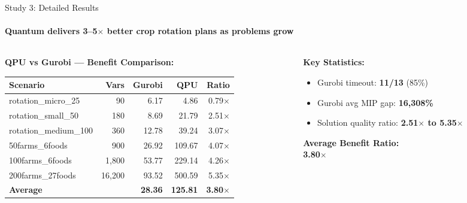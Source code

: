 \documentclass[aspectratio=169,10pt]{beamer}
\begin{document}
\begin{frame}{Study 3: Detailed Results}
\framesubtitle{Quantum delivers 3--5$\times$ better crop rotation plans as problems grow}
\small
\begin{columns}[T]
\begin{column}{0.55\textwidth}
\textbf{QPU vs Gurobi --- Benefit Comparison:}
\begin{table}[h]\scriptsize
\centering
\begin{tabular}{lrrrr}
\toprule
\textbf{Scenario} & \textbf{Vars} & \textbf{Gurobi} & \textbf{QPU} & \textbf{Ratio} \\
\midrule
rotation\_micro\_25 & 90 & 6.17 & 4.86 & 0.79$\times$ \\
rotation\_small\_50 & 180 & 8.69 & 21.79 & 2.51$\times$ \\
rotation\_medium\_100 & 360 & 12.78 & 39.24 & 3.07$\times$ \\
50farms\_6foods & 900 & 26.92 & 109.67 & 4.07$\times$ \\
100farms\_6foods & 1,800 & 53.77 & 229.14 & 4.26$\times$ \\
200farms\_27foods & 16,200 & 93.52 & 500.59 & 5.35$\times$ \\
\midrule
\textbf{Average} & & \textbf{28.36} & \textbf{125.81} & \textbf{3.80$\times$} \\
\bottomrule
\end{tabular}
\end{table}
\end{column}
\begin{column}{0.43\textwidth}
\textbf{Key Statistics:}
\begin{itemize}
    \item Gurobi timeout: \textbf{11/13} (85\%)
    \item Gurobi avg MIP gap: \textbf{16,308\%}
    \item Solution quality ratio: \textbf{2.51$\times$ to 5.35$\times$}
\end{itemize}
\vspace{0.2cm}
\begin{resultbox}
\small\textbf{Average Benefit Ratio:}\\
\centering\Large\textbf{3.80$\times$}
\end{resultbox}
\end{column}
\end{columns}
\end{frame}



\end{document}
